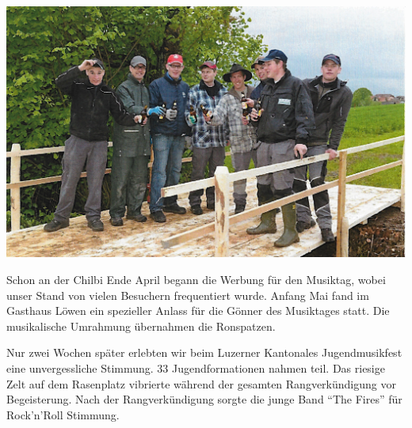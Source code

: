 \begin{history}
    \begin{MulticolFigure}
        \centering
        \includegraphics[width=0.93\linewidth]{./chap/2001-2024/2013/Bau-Marschmusikstrecke.jpg}
    \end{MulticolFigure}

    Schon an der Chilbi Ende April begann die Werbung für den Musiktag, wobei
    unser Stand von vielen Besuchern frequentiert wurde. Anfang Mai fand im
    Gasthaus Löwen ein spezieller Anlass für die Gönner des Musiktages statt.
    Die musikalische Umrahmung übernahmen die Ronspatzen.

    Nur zwei Wochen später erlebten wir beim Luzerner Kantonales Jugendmusikfest
    eine unvergessliche Stimmung. 33 Jugendformationen nahmen teil. Das riesige
    Zelt auf dem Rasenplatz vibrierte während der gesamten Rangverkündigung vor
    Begeisterung.    Nach der Rangverkündigung sorgte die junge Band
    \enquote{The Fires} für Rock'n'Roll Stimmung.


\end{history}
